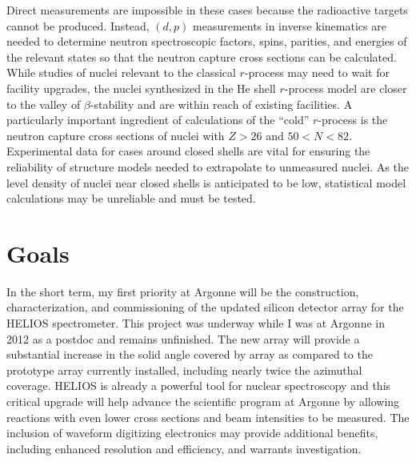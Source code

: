 Direct measurements are impossible in these cases because  the radioactive targets cannot be produced. Instead, $(d,p)$ measurements in inverse kinematics are needed to determine neutron spectroscopic factors, spins, parities, and energies of the relevant states so that the neutron capture cross sections can be calculated.
While studies of nuclei relevant to the classical $r$-process may need to wait for facility upgrades, the nuclei synthesized in the He shell $r$-process model %
are closer to the valley of $\beta$-stability %
and are %
within reach %
of existing facilities.
A particularly important ingredient of calculations of the ``cold'' $r$-process %
is
the neutron capture cross sections of nuclei with $Z>26$ and $50<N<82$. Experimental data for cases around closed shells are vital for ensuring the reliability of structure models needed to extrapolate to unmeasured nuclei. As the level density of nuclei near closed shells is anticipated to be low, statistical model calculations may be unreliable and must be tested. %
\section*{Goals}
In the short term, my first priority at Argonne will be the construction, characterization, and commissioning of the updated silicon detector array for the HELIOS spectrometer.
This project was underway while I was at Argonne in 2012 as a postdoc and remains unfinished. 
The new array will provide a substantial increase in the solid angle covered by array as compared to the prototype array currently installed, including nearly twice the azimuthal coverage. %
HELIOS is already a powerful tool for nuclear spectroscopy and this critical upgrade will help 
advance the scientific program at Argonne by allowing reactions with even lower cross sections and beam intensities to be measured. The inclusion of waveform digitizing electronics may provide additional benefits, including enhanced resolution and efficiency, and warrants investigation.

